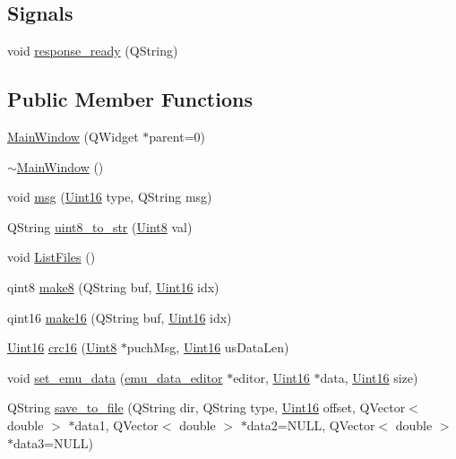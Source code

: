\subsection*{Signals}
\begin{DoxyCompactItemize}
\item 
void \hyperlink{a00006_a3f6396874778799cf07a7a0149e54977}{response\+\_\+ready} (Q\+String)
\end{DoxyCompactItemize}
\subsection*{Public Member Functions}
\begin{DoxyCompactItemize}
\item 
\hyperlink{a00006_a8b244be8b7b7db1b08de2a2acb9409db}{Main\+Window} (Q\+Widget $\ast$parent=0)
\item 
\hyperlink{a00006_ae98d00a93bc118200eeef9f9bba1dba7}{$\sim$\+Main\+Window} ()
\item 
void \hyperlink{a00006_a6134b74dbfffbaf333e169bd09597b53}{msg} (\hyperlink{a00001_aae7407b021d43f7193a81a58cfb3e297}{Uint16} type, Q\+String msg)
\item 
Q\+String \hyperlink{a00006_a8821556476f5a88c107f21d7db14e49c}{uint8\+\_\+to\+\_\+str} (\hyperlink{a00001_a979e3e23b9a449e69ab6a8a83b6042f8}{Uint8} val)
\item 
void \hyperlink{a00006_a61e2ba77e381cae572eec854b6510b81}{List\+Files} ()
\item 
qint8 \hyperlink{a00006_aebce94d5e6af7afff661daf74b208de1}{make8} (Q\+String buf, \hyperlink{a00001_aae7407b021d43f7193a81a58cfb3e297}{Uint16} idx)
\item 
qint16 \hyperlink{a00006_afcb06d9f3a6a555df9355af1dfbb4e21}{make16} (Q\+String buf, \hyperlink{a00001_aae7407b021d43f7193a81a58cfb3e297}{Uint16} idx)
\item 
\hyperlink{a00001_aae7407b021d43f7193a81a58cfb3e297}{Uint16} \hyperlink{a00006_a09ae3cafdd3692fb9fb93bb90a0348d2}{crc16} (\hyperlink{a00001_a979e3e23b9a449e69ab6a8a83b6042f8}{Uint8} $\ast$puch\+Msg, \hyperlink{a00001_aae7407b021d43f7193a81a58cfb3e297}{Uint16} us\+Data\+Len)
\item 
void \hyperlink{a00006_ae9bed0c4d2f2c63c95a68f53f65f4359}{set\+\_\+emu\+\_\+data} (\hyperlink{a00004}{emu\+\_\+data\+\_\+editor} $\ast$editor, \hyperlink{a00001_aae7407b021d43f7193a81a58cfb3e297}{Uint16} $\ast$data, \hyperlink{a00001_aae7407b021d43f7193a81a58cfb3e297}{Uint16} size)
\item 
Q\+String \hyperlink{a00006_a0114355b9f626345cf77d6f714f51468}{save\+\_\+to\+\_\+file} (Q\+String dir, Q\+String type, \hyperlink{a00001_aae7407b021d43f7193a81a58cfb3e297}{Uint16} offset, Q\+Vector$<$ double $>$ $\ast$data1, Q\+Vector$<$ double $>$ $\ast$data2=N\+U\+L\+L, Q\+Vector$<$ double $>$ $\ast$data3=N\+U\+L\+L)
\end{DoxyCompactItemize}
